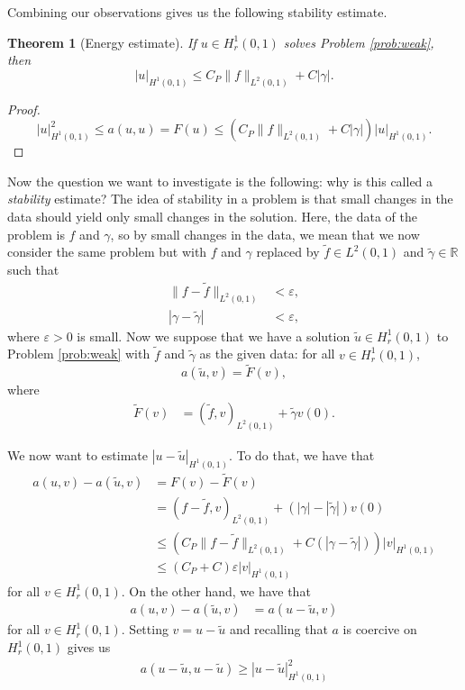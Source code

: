 \documentclass{article}
\theoremstyle{plain}
\newtheorem{theorem}{Theorem}
\theoremstyle{definition}
\begin{document}
Combining our observations gives us the following stability estimate.
\begin{theorem}[Energy estimate]
  If $u \in H^1_r(0,1)$ solves Problem \ref{prob:weak}, then
  \begin{equation}
    |u|_{H^1(0,1)} \leq C_P\|f\|_{L^2(0,1)} + C |\gamma|.
  \end{equation}
\end{theorem}
\begin{proof}
  \begin{equation}
    |u|_{H^1(0,1)}^2 \leq a(u,u) = F(u) \leq \left(C_P\|f\|_{L^2(0,1)} + C|\gamma|\right)|u|_{H^1(0,1)}.
  \end{equation}
\end{proof}
Now the question we want to investigate is the following: why is this called a \emph{stability} estimate?
The idea of stability in a problem is that small changes in the data should yield only small changes in the solution.
Here, the data of the problem is $f$ and $\gamma$, so by small changes in the data, we mean that we now consider the same problem but with $f$ and $\gamma$ replaced by $\widetilde f \in L^2(0,1)$ and $\widetilde \gamma \in \mathbb R$ such that
\begin{align}
  \|f - \widetilde f\|_{L^2(0,1)} & < \varepsilon, \\
  |\gamma - \widetilde \gamma| & < \varepsilon,
\end{align}
where $\varepsilon > 0$ is small.
Now we suppose that we have a solution $\widetilde u \in H^1_r(0,1)$ to Problem \ref{prob:weak} with $\widetilde f$ and $\widetilde \gamma$ as the given data: for all $v \in H^1_r(0,1)$,
\begin{equation}
  a(\widetilde u,v) = \widetilde F(v),
\end{equation}
where
\begin{align}
  \widetilde F(v) & = (\widetilde f, v)_{L^2(0,1)} + \widetilde \gamma v(0).
\end{align}

We now want to estimate $|u - \widetilde u|_{H^1(0,1)}$.
To do that, we have that
\begin{align}
  a(u,v) - a(\widetilde u,v) & = F(v) - \widetilde F(v) \\
                             & = (f - \widetilde f, v)_{L^2(0,1)} + \left(|\gamma| - |\widetilde \gamma|\right)v(0) \\
                             & \leq \left(C_P\|f - \widetilde f\|_{L^2(0,1)} + C\left(|\gamma-\widetilde\gamma|\right)\right)|v|_{H^1(0,1)} \\
                             & \leq (C_P + C)\varepsilon |v|_{H^1(0,1)}
\end{align}
for all $v \in H^1_r(0,1)$.
On the other hand, we have that
\begin{align}
  a(u,v) - a(\widetilde u, v) & = a(u - \widetilde u, v)
\end{align}
for all $v \in H^1_r(0,1)$.
Setting $v = u - \widetilde u$ and recalling that $a$ is coercive on $H^1_r(0,1)$ gives us
\begin{align}
  a(u-\widetilde u, u - \widetilde u) \geq |u - \widetilde u|^2_{H^1(0,1)}
\end{align}
\end{document}
